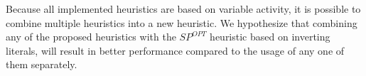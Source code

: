 
Because all implemented heuristics are based on variable activity, it is possible to combine
multiple heuristics into a new heuristic.
We hypothesize that combining any of the proposed heuristics with the $SP^{OPT}$ heuristic based on
inverting literals, will result in better performance compared to the usage of any one of them
separately.

